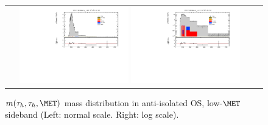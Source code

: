 \begin{figure}[tbhp!]
      \centering
      \begin{tabular}{cc}
        \includegraphics[width=0.45\textwidth]{QCDBGEst_Closure_LowMET_CR_1_20_16.pdf}
        \includegraphics[width=0.45\textwidth]{QCDBGEst_Closure_LowMET_CR__Log_1_20_16.pdf}
      \end{tabular}
     \caption{$m(\tau_{h},\tau_{h},\MET)$ mass distribution in anti-isolated OS, low-$\MET$ sideband (Left: normal scale.  Right: log scale).}
    \label{fig:MG305}
 \end{figure}


